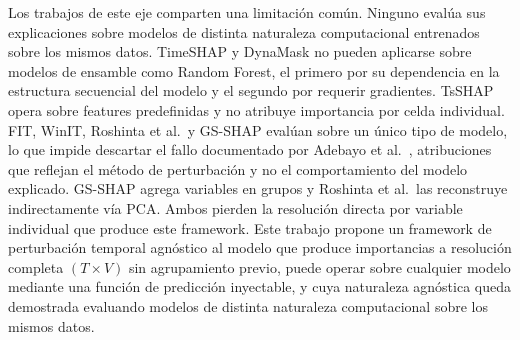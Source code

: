\documentclass[conference, letterpaper]{IEEEtran}
\begin{document}
Los trabajos de este eje comparten una limitación común. Ninguno
evalúa sus explicaciones sobre modelos de distinta naturaleza
computacional entrenados sobre los mismos datos. TimeSHAP y DynaMask
no pueden aplicarse sobre modelos de ensamble como Random Forest, el
primero por su dependencia en la estructura secuencial del modelo y
el segundo por requerir gradientes. TsSHAP opera sobre features
predefinidas y no atribuye importancia por celda individual. FIT,
WinIT, Roshinta et al.\ y GS-SHAP evalúan sobre un único tipo de
modelo, lo que impide descartar el fallo documentado por Adebayo et
al.~\cite{adebayo2018}, atribuciones que reflejan el método de
perturbación y no el comportamiento del modelo explicado. GS-SHAP
agrega variables en grupos y Roshinta et al.\ las reconstruye
indirectamente vía PCA. Ambos pierden la resolución directa por
variable individual que produce este framework. Este trabajo
propone un framework de perturbación temporal agnóstico al modelo
que produce importancias a resolución completa $(T \times V)$ sin
agrupamiento previo, puede operar sobre cualquier modelo mediante
una función de predicción inyectable, y cuya naturaleza agnóstica
queda demostrada evaluando modelos de distinta naturaleza
computacional sobre los mismos datos.
\end{document}
